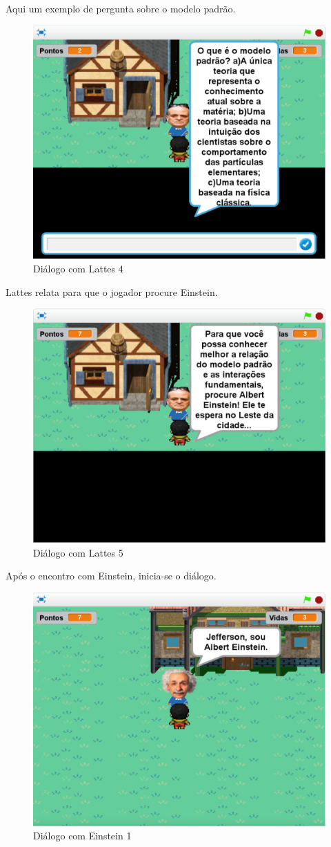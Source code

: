 \documentclass[12pt,fleqn]{book} %
\begin{document}
\newpage

Aqui um exemplo de pergunta sobre o modelo padrão.

\begin{figure}[h]
	\centering
	\includegraphics[width=0.65 \textwidth]{Produto/jogo_13}
	\caption{Diálogo com Lattes 4}
	\label{fig:app_a:jogo13}
\end{figure}


Lattes relata para que o jogador procure Einstein.

\begin{figure}[h]
	\centering
	\includegraphics[width=0.65 \textwidth]{Produto/jogo_14}
	\caption{Diálogo com Lattes 5}
	\label{fig:app_a:jogo14}
\end{figure}

\newpage

Após o encontro com Einstein, inicia-se o diálogo.

\begin{figure}[h]
	\centering
	\includegraphics[width=0.65 \textwidth]{Produto/jogo_15}
	\caption{Diálogo com Einstein 1}
	\label{fig:app_a:jogo15}
\end{figure}
\end{document}
